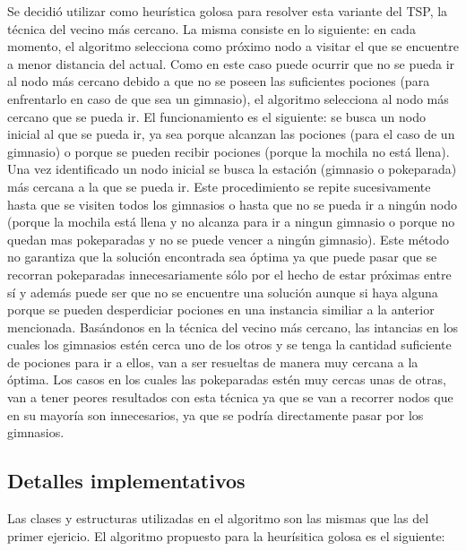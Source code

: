         Se decidió utilizar como heurística golosa para resolver esta variante del TSP, la técnica del vecino más cercano. La misma consiste en lo siguiente: en cada momento, el algoritmo selecciona como próximo nodo a visitar el que se encuentre a menor distancia del actual. Como en este caso puede ocurrir que no se pueda ir al nodo más cercano debido a que no se poseen las suficientes pociones (para enfrentarlo en caso de que sea un gimnasio), el algoritmo selecciona al nodo más cercano que se pueda ir. El funcionamiento es el siguiente: se busca un nodo inicial al que se pueda ir, ya sea porque alcanzan las pociones (para el caso de un gimnasio) o porque se pueden recibir pociones (porque la mochila no está llena). Una vez identificado un nodo inicial se busca la estación (gimnasio o pokeparada) más cercana a la que se pueda ir. Este procedimiento se repite sucesivamente hasta que se visiten todos los gimnasios o hasta que no se pueda ir a ningún nodo (porque la mochila está llena y no alcanza para ir a ningun gimnasio o porque no quedan mas pokeparadas y no se puede vencer a ningún gimnasio).
        Este método no garantiza que la solución encontrada sea óptima ya que puede pasar que se recorran pokeparadas innecesariamente sólo por el hecho de estar próximas entre sí y además puede ser que no se encuentre una solución aunque si haya alguna porque se pueden desperdiciar pociones en una instancia similiar a la anterior mencionada.
        Basándonos en la técnica del vecino más cercano, las intancias en los cuales los gimnasios estén cerca uno de los otros y se tenga la cantidad suficiente de pociones para ir a ellos, van a ser resueltas de manera muy cercana a la óptima. Los casos en los cuales las pokeparadas estén muy cercas unas de otras, van a tener peores resultados con esta técnica ya que se van a recorrer nodos que en su mayoría son innecesarios, ya que se podría directamente pasar por los gimnasios.

        \subsection{Detalles implementativos}
            Las clases y estructuras utilizadas en el algoritmo son las mismas que las del primer ejericio. El algoritmo propuesto para la heurísitica golosa es el siguiente: 

